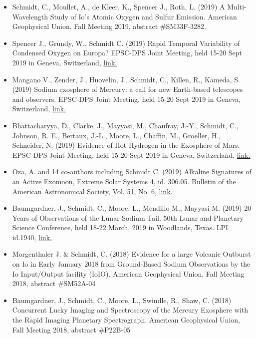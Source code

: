 \documentclass[12pt]{report}
\begin{document}
\begin{itemize}
   \item Schmidt, C., Moullet, A., de Kleer, K., Spencer J., Roth, L. (2019) A Multi-Wavelength Study of Io's Atomic Oxygen and Sulfur Emission. American Geophysical Union, Fall Meeting 2019, abstract \#SM33F-3282.
   \item Spencer J., Grundy, W., Schmidt C. (2019) Rapid Temporal Variability of Condensed Oxygen on Europa? EPSC-DPS Joint Meeting, held 15-20 Sept 2019 in Geneva, Switzerland, \href{https://meetingorganizer.copernicus.org/EPSC-DPS2019/EPSC-DPS2019-935-1.pdf}{link.}
   \item Mangano V., Zender, J., Huovelin, J., Schmidt, C., Killen, R., Kameda, S. (2019) Sodium exosphere of Mercury: a call for new Earth-based telescopes and observers. EPSC-DPS Joint Meeting, held 15-20 Sept 2019 in Geneva, Switzerland, \href{https://meetingorganizer.copernicus.org/EPSC-DPS2019/EPSC-DPS2019-1967-2.pdf}{link.}
   \item Bhattacharyya, D., Clarke, J., Mayyasi, M., Chaufray, J.-Y., Schmidt, C., Johnson, R. E., Bertaux, J.-L., Moore, L., Chaffin, M., Groeller, H., Schneider, N. (2019) Evidence of Hot Hydrogen in the Exosphere of Mars. EPSC-DPS Joint Meeting, held 15-20 Sept 2019 in Geneva, Switzerland, \href{https://meetingorganizer.copernicus.org/EPSC-DPS2019/EPSC-DPS2019-960-1.pdf}{link.}
   \item Oza, A. and 14 co-authors including Schmidt C. (2019) Alkaline Signatures of an Active Exomoon, Extreme Solar Systems 4, id. 306.05. Bulletin of the American Astronomical Society, Vol. 51, No. 6, \href{https://113qx216in8z1kdeyi404hgf-wpengine.netdna-ssl.com/wp-content/uploads/2019/09/exss4_abstracts.pdf#abs306.05}{link.}
   \item Baumgardner, J., Schmidt, C., Moore, L., Mendillo M., Mayyasi M. (2019) 20 Years of Observations of the Lunar Sodium Tail. 50th Lunar and Planetary Science Conference, held 18-22 March, 2019 in Woodlands, Texas. LPI id.1940, \href{https://www.hou.usra.edu/meetings/lpsc2019/pdf/1940.pdf}{link.}
   \item Morgenthaler J. \& Schmidt, C. (2018) Evidence for a large Volcanic Outburst on Io in Early January 2018 from Ground-Based Sodium Observations by the Io Input/Output facility (IoIO). American Geophysical Union, Fall Meeting 2018, abstract \#SM52A-04
   \item Baumgardner, J., Schmidt, C., Moore, L., Swindle, R., Shaw, C. (2018) Concurrent Lucky Imaging and Spectroscopy of the Mercury Exosphere with the Rapid Imaging Planetary Spectrograph. American Geophysical Union, Fall Meeting 2018, abstract \#P22B-05

\end{itemize}
\end{document}

